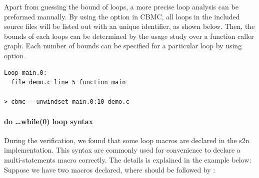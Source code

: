Apart from guessing the bound of loops, a more precise loop analysis can be preformed manually. By using the  option in CBMC, all loops in the included source files will be listed out with an unique identifier, as shown below. Then, the bounds of each loops can be determined by the usage study over a function caller graph. Each number of bounds can be specified for a particular loop by using  option.

\begin{verbatim}
Loop main.0:
  file demo.c line 5 function main
  
> cbmc --unwindset main.0:10 demo.c
\end{verbatim}


\paragraph{do \dots while(0) loop syntax}
During the verification, we found that some  loop macros are declared in the s2n implementation. This syntax are commonly used for convenience to declare a multi-statements macro correctly. The details is explained in the example below: Suppose we have two macros declared, where  should be followed by :

